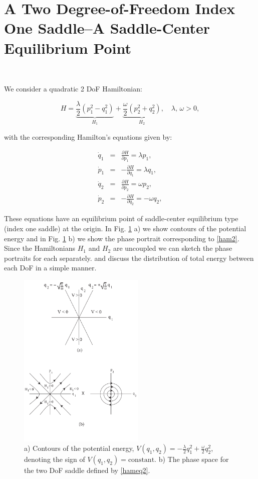 \documentclass{article}
\begin{document}
\section*{A Two Degree-of-Freedom Index One Saddle--A  Saddle-Center Equilibrium Point}
\


We consider  a quadratic 2 DoF  Hamiltonian:


\begin{equation}
H = \underbrace{\frac{\lambda}{2} \left(p_1^2 - q_1^2 \right)}_{H_1} + \underbrace{\frac{\omega}{2} \left(p_2^2 + q_2^2 \right)}_{H_2}, \quad \lambda, \, \omega >0,
\label{ham2}
\end{equation}

\noindent
with the corresponding Hamilton's equations given by:

\begin{eqnarray}
\dot{q}_1 & = & \frac{\partial H}{\partial p_1}= \lambda p_1, \nonumber \\
\dot{p}_1 & = & -\frac{\partial H}{\partial q_1}= \lambda q_1, \nonumber \\
\dot{q}_2 & = & \frac{\partial H}{\partial p_2}= \omega p_2, \nonumber \\
\dot{p}_2 & = & -\frac{\partial H}{\partial q_2}= -\omega q_2, 
\label{hameq2}
\end{eqnarray}

\noindent
These equations have an equilibrium point of saddle-center equilibrium type (index one saddle) at the origin.
In Fig. \ref{fig:2 dof saddle} a) we show contours  of the potential energy and in Fig. \ref{fig:2 dof saddle} b) we show the phase portrait corresponding to \eqref{ham2}. 
Since the Hamiltonians $H_1$ and $H_2$ are uncoupled we can sketch the phase portraits for each separately.  and discuss the distribution of total energy between each DoF in a simple manner.



\begin{figure}[htb!]
\begin{center}
\includegraphics[width=6.0cm]{fig_2_dof_saddle.pdf}
\end{center}
\caption{a) Contours of the potential energy, $V(q_1, q_2) =-\frac{\lambda}{2} q_1^2 + \frac{\omega}{2} q_2^2$,  denoting the sign of $V(q_1, q_2) = \mbox{constant}$. b) The phase space for the two DoF saddle defined by \eqref{hameq2}.}
\label{fig:2 dof saddle}
\end{figure}
\end{document}
